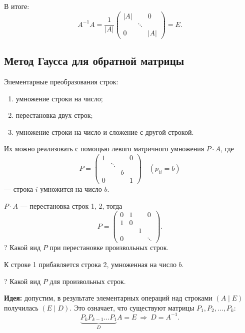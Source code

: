 \documentclass[a4paper, 12pt]{article}
\begin{document}
В итоге:
\[
  A^{-1} A = \frac{1}{|A|} \begin{pmatrix} |A| & & 0 \\ & \ddots & \\ 0 & & |A| \end{pmatrix} = E.
\]

\subsection{Метод Гаусса для обратной матрицы}

Элементарные преобразования строк:
\begin{enumerate}[noitemsep, label=\arabic*)]
  \item умножение строки на число;
  \item перестановка двух строк;
  \item умножение строки на число и сложение с другой строкой.
\end{enumerate}

Их можно реализовать с помощью левого матричного умножения $P \cdot A$, где
\[
  P = \begin{pmatrix} 1 & & & 0 \\ & \ddots & & \\ & & b & \\ 0 & & & 1 \end{pmatrix}
  \quad (p_{ii} = b)
\]
--- строка $i$ умножится на число $b$.

$P \cdot A$ --- перестановка строк 1, 2, тогда
\[
  P = \begin{pmatrix} 0 & 1 & & 0 \\ 1 & 0 & & \\ & & 1 & \\ 0 & & & \ddots \end{pmatrix}.
\]
? Какой вид $P$ при перестановке произвольных строк.

К строке 1 прибавляется строка 2, умноженная на число $b$. 

? Какой вид $P$
для произвольных строк.

\textbf{Идея:} допустим, в результате элементарных операций над строками
$(A \mid E)$ получилась $(E \mid D)$. Это означает, что существуют матрицы
$P_1, P_2, \dots, P_k$:
\[
  \underbrace{P_k P_{k-1} \dots P_1}_{D} A = E \ \Rightarrow\ D = A^{-1}.
\]
\end{document}
